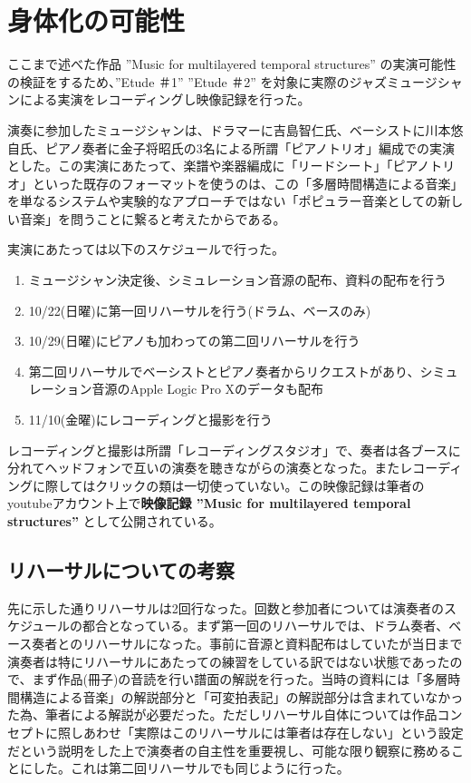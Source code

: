 \documentclass[uplatex,dvipdfmx]{ujarticle}
\begin{document}
\section{身体化の可能性}

ここまで述べた作品 ''Music for multilayered temporal structures'' の実演可能性の検証をするため、''Etude ＃1'' ''Etude ＃2'' を対象に実際のジャズミュージシャンによる実演をレコーディングし映像記録を行った。

演奏に参加したミュージシャンは、ドラマーに吉島智仁氏、ベーシストに川本悠自氏、ピアノ奏者に金子将昭氏の3名による所謂「ピアノトリオ」編成での実演とした。この実演にあたって、楽譜や楽器編成に「リードシート」「ピアノトリオ」といった既存のフォーマットを使うのは、この「多層時間構造による音楽」を単なるシステムや実験的なアプローチではない「ポピュラー音楽としての新しい音楽」を問うことに繋ると考えたからである。

実演にあたっては以下のスケジュールで行った。

\begin{enumerate}
  \item ミュージシャン決定後、シミュレーション音源の配布、資料の配布を行う
  \item 10/22(日曜)に第一回リハーサルを行う(ドラム、ベースのみ)
	\item 10/29(日曜)にピアノも加わっての第二回リハーサルを行う
	\item 第二回リハーサルでベーシストとピアノ奏者からリクエストがあり、シミュレーション音源のApple Logic Pro Xのデータも配布
	\item 11/10(金曜)にレコーディングと撮影を行う
\end{enumerate}

レコーディングと撮影は所謂「レコーディングスタジオ」で、奏者は各ブースに分れてヘッドフォンで互いの演奏を聴きながらの演奏となった。またレコーディングに際してはクリックの類は一切使っていない。この映像記録は筆者のyoutubeアカウント上で{\bf 映像記録 ''Music for multilayered temporal structures''}\cite{yamato:04} として公開されている。

\subsection{リハーサルについての考察}

先に示した通りリハーサルは2回行なった。回数と参加者については演奏者のスケジュールの都合となっている。まず第一回のリハーサルでは、ドラム奏者、ベース奏者とのリハーサルになった。事前に音源と資料配布はしていたが当日まで演奏者は特にリハーサルにあたっての練習をしている訳ではない状態であったので、まず作品(冊子)の音読を行い譜面の解説を行った。当時の資料には「多層時間構造による音楽」の解説部分と「可変拍表記」の解説部分は含まれていなかった為、筆者による解説が必要だった。ただしリハーサル自体については作品コンセプトに照しあわせ「実際はこのリハーサルには筆者は存在しない」という設定だという説明をした上で演奏者の自主性を重要視し、可能な限り観察に務めることにした。これは第二回リハーサルでも同じように行った。
\end{document}
